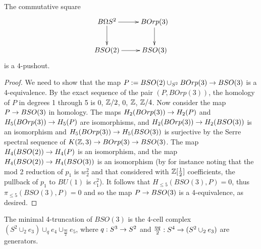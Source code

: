 \documentclass{amsart}
\begin{document}
\begin{proposition}
\label{s2pushout}
The commutative square
\[
\vcenter{\hbox{\xymatrix{
B\Omega S^2 \ar[r] \ar[d] & BOrp(3) \ar[d] \\
BSO(2) \ar[r] & BSO(3)
}}}
\]
is a $4$-pushout.
\end{proposition}
\begin{proof}
We need to show that the map $P := BSO(2) \cup_{S^2} BOrp(3) \rightarrow BSO(3)$ is a 4-equivalence.  By the exact sequence of the pair $(P, BOrp(3))$, the homology of $P$ in degrees 1 through 5 is $0$, $\mathbb Z/2$, $0$, $\mathbb Z$, $\mathbb Z/4$.  Now consider the map $P \rightarrow BSO(3)$ in homology.  The maps $H_2(BOrp(3)) \rightarrow H_2(P)$ and $H_5(BOrp(3)) \rightarrow H_5(P)$ are isomorphisms, and $H_2(BOrp(3)) \rightarrow H_2(BSO(3))$ is an isomorphism and $H_5(BOrp(3)) \rightarrow H_5(BSO(3))$ is surjective by the Serre spectral sequence of $K(\mathbb Z,3) \rightarrow BOrp(3) \rightarrow BSO(3)$.  The map $H_4(BSO(2)) \rightarrow H_4(P)$ is an isomorphism, and the map $H_4(BSO(2)) \rightarrow H_4(BSO(3))$ is an isomorphism (by for instance noting that the mod 2 reduction of $p_1$ is $w_2^2$ and that considered with $\mathbb Z[\frac{1}{2}]$ coefficients, the pullback of $p_1$ to $BU(1)$ is $c_1^2$).  It follows that $H_{\leq 5}(BSO(3),P) = 0$, thus $\pi_{\leq 5}(BSO(3),P) = 0$ and so the map $P \rightarrow BSO(3)$ is a 4-equivalence, as desired.
\end{proof}


\begin{corollary}
\label{cor-bso3trunc}
The minimal 4-truncation of $BSO(3)$ is the 4-cell complex $(S^2 \cup_2 e_3) \cup_q e_4 \cup_{\frac{\eta q}{2}} e_5$, where $q: S^3 \rightarrow S^2$ and $\frac{\eta q}{2}: S^4 \rightarrow (S^2 \cup_2 e_3)$ are generators.
\end{corollary}
\end{document}
